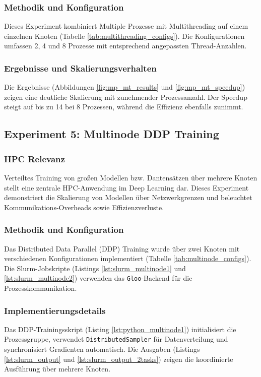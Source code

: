 \documentclass{article}
\begin{document}
\subsubsection{Methodik und Konfiguration}
Dieses Experiment kombiniert Multiple Prozesse mit Multithreading auf einem einzelnen Knoten (Tabelle \ref{tab:multithreading_configs}). 
Die Konfigurationen umfassen 2, 4 und 8 Prozesse mit entsprechend angepassten Thread-Anzahlen.

\subsubsection{Ergebnisse und Skalierungsverhalten}
Die Ergebnisse (Abbildungen \ref{fig:mp_mt_results} und \ref{fig:mp_mt_speedup}) zeigen eine deutliche Skalierung mit zunehmender Prozessanzahl. 
Der Speedup steigt auf bis zu 14 bei 8 Prozessen, während die Effizienz ebenfalls zunimmt.

\subsection{Experiment 5: Multinode DDP Training}
\subsubsection{HPC Relevanz}
Verteiltes Training von großen Modellen bzw. Dantensätzen über mehrere Knoten stellt eine zentrale HPC-Anwendung 
im Deep Learning dar. Dieses Experiment demonstriert die Skalierung von Modellen 
über Netzwerkgrenzen und beleuchtet Kommunikations-Overheads sowie Effizienzverluste.

\subsubsection{Methodik und Konfiguration}
Das Distributed Data Parallel (DDP) Training wurde über zwei Knoten mit verschiedenen Konfigurationen implementiert (Tabelle 
\ref{tab:multinode_configs}). Die Slurm-Jobskripte (Listings \ref{lst:slurm_multinode1} und \ref{lst:slurm_multinode2}) verwenden 
das \texttt{Gloo}-Backend für die Prozesskommunikation.

\subsubsection{Implementierungsdetails}
Das DDP-Trainingsskript (Listing \ref{lst:python_multinode1}) initialisiert die Prozessgruppe, verwendet \texttt{DistributedSampler} 
für Datenverteilung und synchronisiert Gradienten automatisch. Die Ausgaben (Listings \ref{lst:slurm_output} und \ref{lst:slurm_output_2tasks}) 
zeigen die koordinierte Ausführung über mehrere Knoten.
\end{document}
